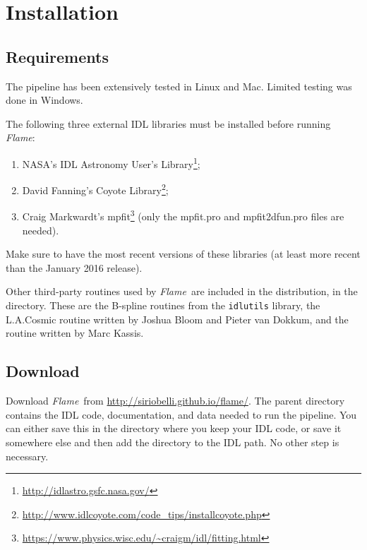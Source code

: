 \documentclass[a4paper]{article}
\newcommand{\flame}{\emph{Flame}}
\begin{document}
\begin{sloppypar}
\section{Installation}
\label{sec:installation}


\subsection{Requirements}

The pipeline has been extensively tested in Linux and Mac. Limited testing was done in Windows.

The following three external IDL libraries must be installed before running \flame:
\begin{enumerate}
\item NASA's IDL Astronomy User's Library\footnote{\url{http://idlastro.gsfc.nasa.gov/}};
\item David Fanning's Coyote Library\footnote{\url{http://www.idlcoyote.com/code_tips/installcoyote.php}};
\item Craig Markwardt's mpfit\footnote{\url{https://www.physics.wisc.edu/~craigm/idl/fitting.html}} (only the mpfit.pro and mpfit2dfun.pro files are needed).
\end{enumerate}
Make sure to have the most recent versions of these libraries (at least more recent than the January 2016 release).

Other third-party routines used by \flame\ are included in the distribution, in the  directory. These are the B-spline routines from the \texttt{idlutils} library, the L.A.Cosmic routine written by Joshua Bloom and Pieter van Dokkum, and the  routine written by Marc Kassis.


\subsection{Download}

Download \flame\ from \url{http://siriobelli.github.io/flame/}. The parent directory  contains the IDL code, documentation, and data needed to run the pipeline. You can either save this in the directory where you keep your IDL code, or save it somewhere else and then add the  directory to the IDL path. No other step is necessary.









\end{sloppypar}
\end{document}
